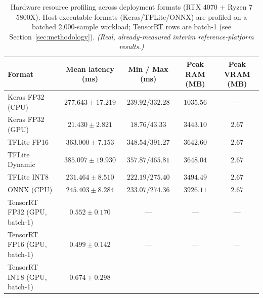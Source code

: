 \documentclass[11pt,a4paper]{article}
\newcommand{\realnote}{{\footnotesize\color{blue!50!black}\textit{(Real, already-measured interim reference-platform results.)}}}
\begin{document}
\begin{table}[ht]
\centering
\small
\caption{Hardware resource profiling across deployment formats (RTX 4070 + Ryzen 7 5800X). Host-executable formats (Keras/TFLite/ONNX) are profiled on a batched 2{,}000-sample workload; TensorRT rows are batch-1 (see Section~\ref{sec:methodology}). \realnote}
\label{tab:rtx-hardware}
\begin{tabular}{@{}lcccc@{}}
\toprule
Format & Mean latency (ms) & Min / Max (ms) & Peak RAM (MB) & Peak VRAM (MB) \\
\midrule
Keras FP32 (CPU) & $277.643 \pm 17.219$ & $239.92 / 332.28$ & $1035.56$ & --- \\
Keras FP32 (GPU) & $21.430 \pm 2.821$ & $18.76 / 43.33$ & $3443.10$ & $2.67$ \\
TFLite FP16 & $363.000 \pm 7.153$ & $348.54 / 391.27$ & $3642.60$ & $2.67$ \\
TFLite Dynamic & $385.097 \pm 19.930$ & $357.87 / 465.81$ & $3648.04$ & $2.67$ \\
TFLite INT8 & $231.464 \pm 8.510$ & $222.19 / 275.40$ & $3494.49$ & $2.67$ \\
ONNX (CPU) & $245.403 \pm 8.284$ & $233.07 / 274.36$ & $3926.11$ & $2.67$ \\
TensorRT FP32 (GPU, batch-1) & $0.552 \pm 0.170$ & --- & --- & --- \\
TensorRT FP16 (GPU, batch-1) & $0.499 \pm 0.142$ & --- & --- & --- \\
TensorRT INT8 (GPU, batch-1) & $0.674 \pm 0.298$ & --- & --- & --- \\
\bottomrule
\end{tabular}
\end{table}
\end{document}
